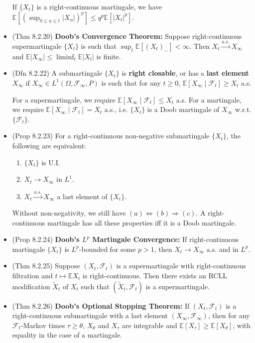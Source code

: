 \documentclass[twoside]{article}
\newcommand{\dis}{\displaystyle}
\newcommand\bbE{\mathbb{E}}
\newcommand\calF{\mathcal{F}}
\newcommand\Om{\Omega}
\def\t{\theta}
\newcommand\goesto{\rightarrow}
\begin{document}
\begin{itemize}
If $\{X_t\}$ is a right-continuous martingale, we have $\bbE \left[ \left(\dis\sup_{0 \leq u \leq t} |X_u| \right)^p \right] \leq q^p \bbE [|X_t|^p]$.

\item (Thm 8.2.20) \textbf{Doob's Convergence Theorem:} Suppose right-continuous supermartingale $\{X_t\}$ is such that $\sup_t \bbE [(X_t)_-] < \infty$. Then $X_t \stackrel{a.s.}{\goesto} X_\infty$ and $\bbE |X_\infty| \leq \liminf_t \bbE |X_t|$ is finite.

\item (Dfn 8.2.22) A submartingale $\{X_t\}$ is \textbf{right closable}, or has a \textbf{last element} $X_\infty$ if $X_\infty \in L^1(\Om, \calF_\infty, P)$ is such that for any $t \geq 0$, $\bbE [X_\infty \mid \calF_t] \geq X_t$ a.s.

For a supermartingale, we require $\bbE [X_\infty \mid \calF_t] \leq X_t$ a.s. For a martingale, we require $\bbE [X_\infty \mid \calF_t] = X_t$ a.s., i.e. $\{ X_t\}$ is a Doob martingale of $X_\infty$ w.r.t. $\{ \calF_t\}$.

\item (Prop 8.2.23) For a right-continuous non-negative submartingale $\{X_t\}$, the following are equivalent:
\begin{enumerate}[label = (\alph*)]
\item $\{X_t\}$ is U.I.
\item $X_t \goesto X_\infty$ in $L^1$.
\item $X_t \stackrel{a.s.}{\goesto} X_\infty$ a last element of $\{ X_t\}$.
\end{enumerate}
Without non-negativity, we still have $(a) \Leftrightarrow (b) \Rightarrow (c)$. A right-continuous martingale has all these properties iff it is a Doob martingale.

\item (Prop 8.2.24) \textbf{Doob's $L^p$ Martingale Convergence:} If right-continuous martingale $\{X_t\}$ is $L^p$-bounded for some $p > 1$, then $X_t \goesto X_\infty$ a.s. and in $L^p$.

\item (Thm 8.2.25) Suppose $(X_t, \calF_t)$ is a supermartingale with right-continuous filtration and $t \mapsto \bbE X_t$ is right-continuous. Then there exists an RCLL modification $\tilde{X}_t$ of $X_t$ such that $(\tilde{X}_t, \calF_t)$ is a supermartingale.

\item (Thm 8.2.26) \textbf{Doob's Optional Stopping Theorem:} If $(X_t, \calF_t)$ is a right-continuous submartingale with a last element $(X_\infty, \calF_\infty)$, then for any $\calF_t$-Markov times $\tau \geq \t$, $X_\t$ and $X_\tau$ are integrable and $\bbE [X_\tau] \geq \bbE [X_\t]$, with equality in the case of a martingale.


\end{itemize}
\end{document}
